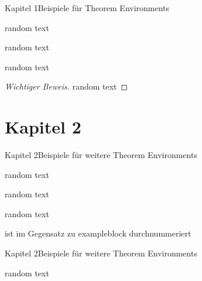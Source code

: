 \begin{frame}{Kapitel 1}{Beispiele für Theorem Environments}
  \begin{theorem}
    random text
  \end{theorem}

  \begin{corollary}
    random text
  \end{corollary}

  \begin{lemma}
    random text
  \end{lemma}

  \begin{proof}[Wichtiger Beweis]
    random text
  \end{proof}
\end{frame}

\if{}\section{Kapitel 2}\fi

\begin{frame}[label={kapitel2}]{Kapitel 2}{Beispiele für weitere Theorem Environments}

  \begin{definition}[test]
    random text
  \end{definition}

  \begin{definitions}[test]
    random text
  \end{definitions}

  \begin{fact}[test]
    random text
  \end{fact}

  \begin{example}[test]
    ist im Gegensatz zu exampleblock durchnummeriert
  \end{example}
\end{frame}

\begin{frame}{Kapitel 2}{Beispiele für weitere Theorem Environments}
  \begin{examples}[test]
    random text
  \end{examples}
\end{frame}

